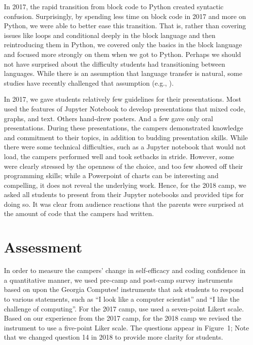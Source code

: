 In 2017, the rapid transition from block code to Python created
syntactic confusion.  Surprisingly, by spending less time on block
code in 2017 and more on Python, we were able to better ease this
transition.  That is, rather than covering issues like loops and
conditional deeply in the block language and then reintroducing
them in Python, we covered only the basics in the block language
and focused more strongly on them when we got to Python.  Perhaps
we should not have surprised about the difficulty students had
transitioning between languages.  While there is an assumption that
language transfer is natural, some studies have recently challenged
that assumption (e.g., \cite{Chetty12,Dann12}).

In 2017, we gave students relatively few guidelines for their
presentations.  Most used the features of Jupyter Notebook to develop
presentations that mixed code, graphs, and text.  Others hand-drew
posters.  And a few gave only oral presentations.  During these
presentations, the campers demonstrated knowledge and commitment
to their topics, in addition to budding presentation skills. While
there were some technical difficulties, such as a Jupyter notebook
that would not load, the campers performed well and took setbacks
in stride.  However, some were clearly stressed by the openness of
the choice, and too few showed off their programming skills; while
a Powerpoint of charts can be interesting and compelling, it does
not reveal the underlying work.  Hence, for the 2018 camp, we asked
all students to present from their Jupyter notebooks and provided
tips for doing so.  It was clear from audience reactions that the
parents were surprised at the amount of code that the campers had
written.

\section{Assessment}

In order to measure the campers' change in self-efficacy and coding
confidence in a quantitative manner, we used pre-camp and post-camp
survey
instruments based on upon the Georgia Computes! instruments
\cite{Bruckman2009} that ask students to respond to various statements,
such as ``I look like a computer scientist'' and ``I like the
challenge of computing''.  For the 2017 camp, use used  a seven-point
Likert scale.  Based on our experience from the 2017 camp, for the
2018 camp we revised the instrument to use a five-point Liker scale.
The questions appear in Figure~1; Note that we changed question
14 in 2018 to provide more clarity for students.

